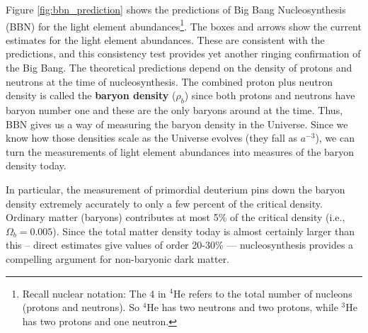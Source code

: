 \documentclass[a4paper,11pt]{article}
\begin{document}
{\noindent}Figure \ref{fig:bbn_prediction} shows the predictions of Big Bang Nucleosynthesis (BBN) for the light element abundances\footnote{Recall nuclear notation: The 4 in $^4$He refers to the total number of nucleons (protons and neutrons). So $^4$He has two neutrons and two protons, while $^3$He has two protons and one neutron.}. The boxes and arrows show the current estimates for the light element abundances. These are consistent with the predictions, and this consistency test provides yet another ringing confirmation of the Big Bang. The theoretical predictions depend on the density of protons and neutrons at the time of nucleosynthesis. The combined proton plus neutron density is called the \textbf{baryon density} ($\rho_b$) since both protons and neutrons have baryon number one and these are the only baryons around at the time. Thus, BBN gives us a way of measuring the baryon density in the Universe. Since we know how those densities scale as the Universe evolves (they fall as $a^{-3}$), we can turn the measurements of light element abundances into measures of the baryon density today.

{\noindent}In particular, the measurement of primordial deuterium pins down the baryon density extremely accurately to only a few percent of the critical density. Ordinary matter (baryons) contributes at most 5\% of the critical density (i.e., $\Omega_b = 0.005$). Since the total matter density today is almost certainly larger than this -- direct estimates give values of order 20-30\% — nucleosynthesis provides a compelling argument for non-baryonic dark matter.
\end{document}

